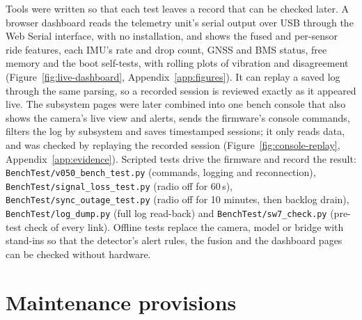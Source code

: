 Tools were written so that each test leaves a record that can be checked later. A browser dashboard reads the telemetry unit's serial output over USB through the Web Serial interface, with no installation, and shows the fused and per-sensor ride features, each IMU's rate and drop count, GNSS and BMS status, free memory and the boot self-tests, with rolling plots of vibration and disagreement (Figure~\ref{fig:live-dashboard}, Appendix~\ref{app:figures}). It can replay a saved log through the same parsing, so a recorded session is reviewed exactly as it appeared live. The subsystem pages were later combined into one bench console that also shows the camera's live view and alerts, sends the firmware's console commands, filters the log by subsystem and saves timestamped sessions; it only reads data, and was checked by replaying the recorded session (Figure~\ref{fig:console-replay}, Appendix~\ref{app:evidence}). Scripted tests drive the firmware and record the result: \texttt{BenchTest/\allowbreak{}v050\_\allowbreak{}bench\_\allowbreak{}test.py} (commands, logging and reconnection), \texttt{BenchTest/\allowbreak{}signal\_\allowbreak{}loss\_\allowbreak{}test.py} (radio off for 60\,s), \texttt{BenchTest/\allowbreak{}sync\_\allowbreak{}outage\_\allowbreak{}test.py} (radio off for 10 minutes, then backlog drain), \texttt{BenchTest/log\_dump.py} (full log read-back) and \texttt{BenchTest/sw7\_check.py} (pre-test check of every link). Offline tests replace the camera, model or bridge with stand-ins so that the detector's alert rules, the fusion and the dashboard pages can be checked without hardware.

\section{Maintenance provisions}
\label{sec:impl-maint}

